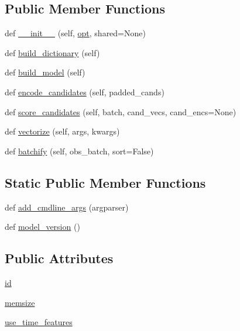 \subsection*{Public Member Functions}
\begin{DoxyCompactItemize}
\item 
def \hyperlink{classparlai_1_1agents_1_1memnn_1_1memnn_1_1MemnnAgent_a256f911504285d19b006def388d0772f}{\+\_\+\+\_\+init\+\_\+\+\_\+} (self, \hyperlink{classparlai_1_1core_1_1torch__agent_1_1TorchAgent_a785bb920cf8c8afc3e9bf6a8b77e335a}{opt}, shared=None)
\item 
def \hyperlink{classparlai_1_1agents_1_1memnn_1_1memnn_1_1MemnnAgent_af314871636896b61139ef761765a1872}{build\+\_\+dictionary} (self)
\item 
def \hyperlink{classparlai_1_1agents_1_1memnn_1_1memnn_1_1MemnnAgent_aa5b5782548443a008c0502ec9ddedee2}{build\+\_\+model} (self)
\item 
def \hyperlink{classparlai_1_1agents_1_1memnn_1_1memnn_1_1MemnnAgent_ab0c47ca129aeec437446202c941e0a56}{encode\+\_\+candidates} (self, padded\+\_\+cands)
\item 
def \hyperlink{classparlai_1_1agents_1_1memnn_1_1memnn_1_1MemnnAgent_a10b5418eda4da7bc85913e24e5b5a029}{score\+\_\+candidates} (self, batch, cand\+\_\+vecs, cand\+\_\+encs=None)
\item 
def \hyperlink{classparlai_1_1agents_1_1memnn_1_1memnn_1_1MemnnAgent_a4c2d3c0bb7d0b78b1c6aa91eca8dd24e}{vectorize} (self, args, kwargs)
\item 
def \hyperlink{classparlai_1_1agents_1_1memnn_1_1memnn_1_1MemnnAgent_a463b88b1d7fc9a7adea9802762c5968c}{batchify} (self, obs\+\_\+batch, sort=False)
\end{DoxyCompactItemize}
\subsection*{Static Public Member Functions}
\begin{DoxyCompactItemize}
\item 
def \hyperlink{classparlai_1_1agents_1_1memnn_1_1memnn_1_1MemnnAgent_a25443d48c341d3f88a648c8273dfbf66}{add\+\_\+cmdline\+\_\+args} (argparser)
\item 
def \hyperlink{classparlai_1_1agents_1_1memnn_1_1memnn_1_1MemnnAgent_ae6e06364ccf919d70064d5966e5c1cf3}{model\+\_\+version} ()
\end{DoxyCompactItemize}
\subsection*{Public Attributes}
\begin{DoxyCompactItemize}
\item 
\hyperlink{classparlai_1_1agents_1_1memnn_1_1memnn_1_1MemnnAgent_ac313c81db957b095beb84fa7ef1c1286}{id}
\item 
\hyperlink{classparlai_1_1agents_1_1memnn_1_1memnn_1_1MemnnAgent_a73e14a945e200d85f239a6d1f08c8d54}{memsize}
\item 
\hyperlink{classparlai_1_1agents_1_1memnn_1_1memnn_1_1MemnnAgent_a259eb74db201a70a8f82f160860d7b88}{use\+\_\+time\+\_\+features}
\end{DoxyCompactItemize}
